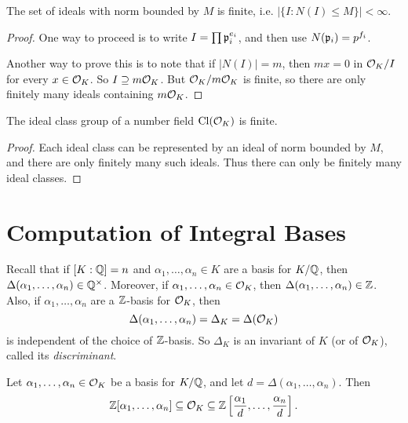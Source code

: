 \begin{lemma}
  The set of ideals with norm bounded by $M$
  is finite, i.e. $|\{I : N(I) \le M\}| < \infty$.
\end{lemma}

\begin{proof}
  One way to proceed is to write $I = \prod \mathfrak{p}_i^{e_i}$,
  and then use $N(\mathfrak{p}_i) = p^{f_i}$.

  Another way to prove this is to note that
  if $|N(I)| = m$, then $mx = 0$ in
  $\mathcal{O}_K / I$ for every $x \in \mathcal{O}_K$. So
  $I \supseteq m \mathcal{O}_K$. But
  $\mathcal{O}_K / m \mathcal{O}_K$ is finite, so there are only
  finitely many ideals containing $m \mathcal{O}_K$.
\end{proof}

\begin{corollary}
  The ideal class group of a number field $\operatorname{Cl}(\mathcal{O}_K)$ is finite.
\end{corollary}

\begin{proof}
  Each ideal class can be represented by an ideal of
  norm bounded by $M$, and there are only
  finitely many such ideals. Thus there can only be
  finitely many ideal classes.
\end{proof}

\section{Computation of Integral Bases}

\begin{remark}
  Recall that if $[K : \mathbb{Q}] = n$ and
  $\alpha_1, \dots, \alpha_n \in K$ are a basis for
  $K / \mathbb{Q}$, then
  $\Delta(\alpha_1, \dots, \alpha_n) \in \mathbb{Q}^\times$.
  Moreover, if $\alpha_1, \dots, \alpha_n \in \mathcal{O}_K$,
  then $\Delta(\alpha_1, \dots, \alpha_n) \in \mathbb{Z}$.
  Also, if $\alpha_1, \dots, \alpha_n$ are a $\mathbb{Z}$-basis
  for $\mathcal{O}_K$, then
  \[
    \Delta(\alpha_1, \dots, \alpha_n) = \Delta_K = \Delta(\mathcal{O}_K)
  \]
  is independent of the choice of $\mathbb{Z}$-basis. So
  $\Delta_K$ is an invariant of $K$ (or of $\mathcal{O}_K$),
  called its \emph{discriminant}.
\end{remark}

\begin{prop}
  Let $\alpha_1, \dots, \alpha_n \in \mathcal{O}_K$ be a basis
  for $K / \mathbb{Q}$, and let
  $d = \Delta(\alpha_1, \dots, \alpha_n)$. Then
  \[
    \mathbb{Z}[\alpha_1, \dots, \alpha_n]
    \subseteq \mathcal{O}_K \subseteq
    \mathbb{Z}\left[\frac{\alpha_1}{d}, \dots, \frac{\alpha_n}{d}\right].
  \]
\end{prop}

